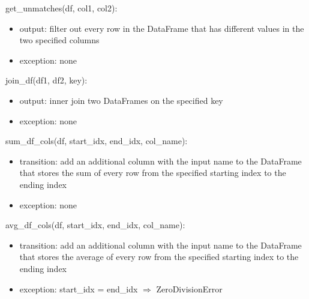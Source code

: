 \documentclass[12pt]{article}
\begin{document}
\noindent get\_unmatches(df, col1, col2):
\begin{itemize}
    \item output: filter out every row in the DataFrame that has different values in the two specified columns
    \item exception: none
\end{itemize}

\noindent join\_df(df1, df2, key):
\begin{itemize}
    \item output: inner join two DataFrames on the specified key
    \item exception: none
\end{itemize}

\noindent sum\_df\_cols(df, start\_idx, end\_idx, col\_name):
\begin{itemize}
    \item transition: add an additional column with the input name to the DataFrame that stores the sum of 
    every row from the specified starting index to the ending index
    \item exception: none
\end{itemize}

\noindent avg\_df\_cols(df, start\_idx, end\_idx, col\_name):
\begin{itemize}
    \item transition: add an additional column with the input name to the DataFrame that stores the average of 
    every row from the specified starting index to the ending index
    \item exception: start\_idx = end\_idx $\Rightarrow$ ZeroDivisionError
\end{itemize}


\end{document}
